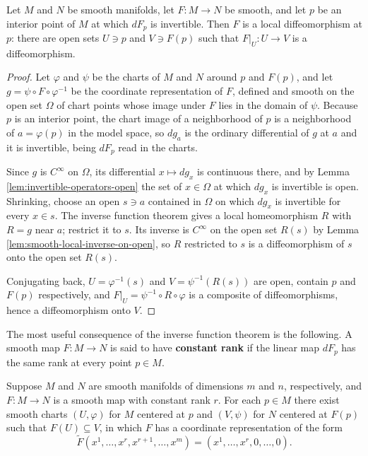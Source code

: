 \begin{lemma}
\label{lem:local-diffeomorphism-from-invertible-differential}
\leanok
{}
Let $M$ and $N$ be smooth manifolds, let $F : M \to N$ be smooth, and let $p$ be an interior point of $M$ at which $dF_p$ is invertible. Then $F$ is a local diffeomorphism at $p$: there are open sets $U \ni p$ and $V \ni F(p)$ such that $F|_U : U \to V$ is a diffeomorphism.
\end{lemma}

\begin{proof}
\leanok
{}
Let $\varphi$ and $\psi$ be the charts of $M$ and $N$ around $p$ and $F(p)$, and let $g = \psi \circ F \circ \varphi^{-1}$ be the coordinate representation of $F$, defined and smooth on the open set $\Omega$ of chart points whose image under $F$ lies in the domain of $\psi$. Because $p$ is an interior point, the chart image of a neighborhood of $p$ is a neighborhood of $a = \varphi(p)$ in the model space, so $dg_a$ is the ordinary differential of $g$ at $a$ and it is invertible, being $dF_p$ read in the charts.

Since $g$ is $C^\infty$ on $\Omega$, its differential $x \mapsto dg_x$ is continuous there, and by Lemma \ref{lem:invertible-operators-open} the set of $x \in \Omega$ at which $dg_x$ is invertible is open. Shrinking, choose an open $s \ni a$ contained in $\Omega$ on which $dg_x$ is invertible for every $x \in s$. The inverse function theorem gives a local homeomorphism $R$ with $R = g$ near $a$; restrict it to $s$. Its inverse is $C^\infty$ on the open set $R(s)$ by Lemma \ref{lem:smooth-local-inverse-on-open}, so $R$ restricted to $s$ is a diffeomorphism of $s$ onto the open set $R(s)$.

Conjugating back, $U = \varphi^{-1}(s)$ and $V = \psi^{-1}(R(s))$ are open, contain $p$ and $F(p)$ respectively, and $F|_U = \psi^{-1} \circ R \circ \varphi$ is a composite of diffeomorphisms, hence a diffeomorphism onto $V$.
\end{proof}

The most useful consequence of the inverse function theorem is the following. A smooth map $F: M \to N$ is said to have \textbf{constant rank} if the linear map $dF_p$ has the same rank at every point $p \in M$.

\begin{theorem}
\label{thm:rank-theorem}
Suppose $M$ and $N$ are smooth manifolds of dimensions $m$ and $n$, respectively, and $F: M \to N$ is a smooth map with constant rank $r$. For each $p \in M$ there exist smooth charts $(U, \varphi)$ for $M$ centered at $p$ and $(V, \psi)$ for $N$ centered at $F(p)$ such that $F(U) \subseteq V$, in which $F$ has a coordinate representation of the form
\begin{equation}
\tilde{F}(x^1, \ldots, x^r, x^{r+1}, \ldots, x^m) = (x^1, \ldots, x^r, 0, \ldots, 0). \tag{A.5}
\end{equation}
\end{theorem}

